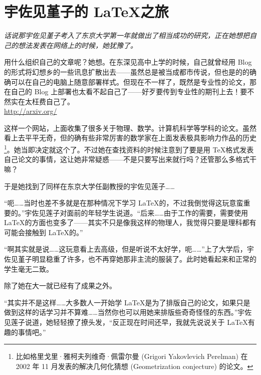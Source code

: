 \chapter[宇佐见堇子的 \LaTeX 之旅]{宇佐见堇子的 \LaTeX 之旅}

\begin{center}
    \begin{tcolorbox}[colback=black!15!white,%
            colframe=black!80,%
            width=15cm,%
            arc=2mm, auto outer arc,
            boxrule=0.5pt,
            title=前言,
        ]
        {\itshape\setlength{\parindent}{2em} 话说那宇佐见堇子考入了东京大学第一年就做出了相当成功的研究，正在她想把自己的想法发表在网络上的时候，她犹豫了。

            用什么组织自己的文章呢？她想。在东深见高中上学的时候，自己就曾经用 Blog 的形式将幻想乡的一些讯息扩散出去——虽然总是被当成都市传说，但也是的的确确可以在自己的电脑上随意部署样式。但现在不一样了，既然是专业性的论文，那在自己的 Blog 上部署也太看不起自己了——好歹要传到专业性的期刊上去！要不然实在太枉费自己了。\\


            \url{http://arxiv.org/}

            这样一个网站，上面收集了很多关于物理、数学。计算机科学等学科的论文。虽然看上去平平无奇，但的确有些非常厉害的数学家在上面发表极具影响力作品的历史\footnote{比如格里戈里·雅柯夫列维奇·佩雷尔曼 (Grigori Yakovlevich Perelman) 在 2002 年 11 月发表的解决几何化猜想 (Geometrization conjecture) 的论文。}。她当即决定就这个了。不过她在查找资料的时候注意到了要是用 \TeX 格式发表自己论文的事情，这让她非常疑惑——不是只要写出来就行吗？还管那么多格式干嘛？

            于是她找到了同样在东京大学任副教授的宇佐见莲子……
        }
    \end{tcolorbox}
\end{center}


“呃……当时也差不多就是在那种情况下学习 \LaTeX 的，不过我倒觉得这玩意蛮重要的。”宇佐见莲子对面前的年轻学生说道。“后来……由于工作的需要，需要使用 \LaTeX 的方面也变多了——其实不只是像我这样的物理人，我觉得只要是理科都有可能会接触到 \LaTeX 的。”

“啊其实就是说……这玩意看上去高级，但是听说不太好学，呃……”上了大学后，宇佐见堇子明显稳重了许多，也不再穿她那非主流的服装了。此时她看起来和正常的学生毫无二致。

除了她在大一就已经有了成果之外。

“其实并不是这样……大多数人一开始学 \LaTeX 是为了排版自己的论文，如果只是做到这样的话学习并不算难……当然你也可以用她来排版些奇奇怪怪的东西。”宇佐见莲子说道，她轻轻撩了撩头发，“反正现在时间还早，我就先说说关于 \LaTeX 有趣的事情吧。”

